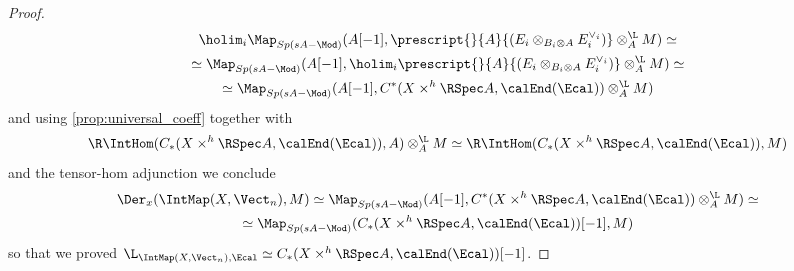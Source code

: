 \begin{proof}
            \begin{gather*}
                \holim_i \Map_{Sp(sA-\Mod)}(A[-1], \prescript{}{A}{(E_i \otimes_{B_i \otimes A} E_i^{\vee_i})} \otimes_A^{\L} M) \simeq \\ 
                \simeq \Map_{Sp(sA-\Mod)}(A[-1], \holim_i \prescript{}{A}{(E_i \otimes_{B_i \otimes A} E_i^{\vee_i})} \otimes^{\L}_A M) \simeq  \\ 
                \simeq \Map_{Sp(sA-\Mod)}(A[-1], C^*(X \times^h \RSpec A, \calEnd(\Ecal)) \otimes_A^{\L} M)
            \end{gather*}
            and using \cref{prop:universal_coeff} together with \[\R\IntHom(C_*(X \times^h \RSpec A, \calEnd(\Ecal)), A) \otimes_A^{\L} M \simeq \R\IntHom(C_*(X \times^h \RSpec A, \calEnd(\Ecal)), M)\] and the tensor-hom adjunction we conclude 
            \begin{gather*}
                \Der_x(\IntMap(X, \Vect_n), M) \simeq \Map_{Sp(sA-\Mod)}(A[-1], C^*(X \times^h \RSpec A, \calEnd(\Ecal)) \otimes_A^{\L} M) \simeq  \\ 
                \simeq \Map_{Sp(sA-\Mod)}(C_*(X \times^h \RSpec A, \calEnd(\Ecal))[-1], M)
            \end{gather*}
            so that we proved $\L_{\IntMap(X, \Vect_n), \Ecal} \simeq C_*(X \times^h \RSpec A, \calEnd(\Ecal))[-1]$.


\end{proof}
